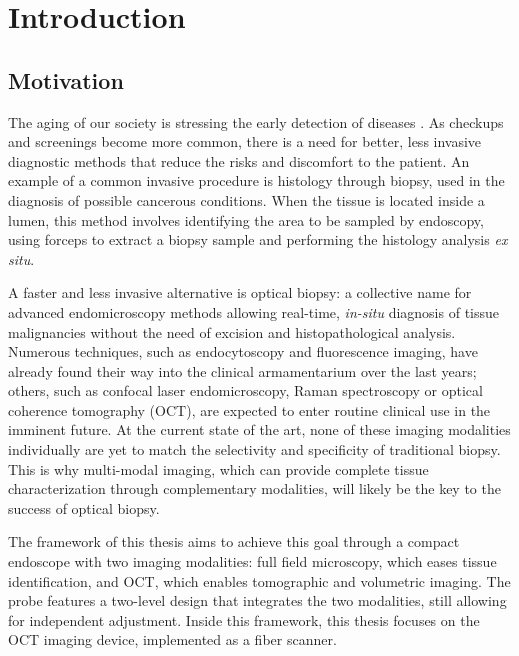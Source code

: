 %

\chapter{Introduction}
\label{Ch:Introduction}


\section{Motivation}
The aging of our society is stressing the early detection of diseases \cite{Fendrich2007}. As checkups and screenings become more common, there is a need for better, less invasive diagnostic methods that reduce the risks and discomfort to the patient. An example of a common invasive procedure is histology through biopsy, used in the diagnosis of possible cancerous conditions. When the tissue is located inside a lumen, this method involves identifying the area to be sampled by endoscopy, using forceps to extract a biopsy sample and performing the histology analysis \textit{ex situ}. 

A faster and less invasive alternative is optical biopsy: a collective name for advanced endomicroscopy methods allowing real-time, \textit{in-situ} diagnosis of tissue malignancies without the need of excision and histopathological analysis. Numerous techniques, such as endocytoscopy and fluorescence imaging, have already found their way into the clinical armamentarium over the last years; others, such as confocal laser endomicroscopy\cite{Jabbour2013}, Raman spectroscopy \cite{Bergholt2011} or optical coherence tomography (OCT)\cite{Park2012,Sun2011}, are expected to enter routine clinical use in the imminent future. At the current state of the art, none of these imaging modalities individually are yet to match the selectivity and specificity of traditional biopsy. This is why multi-modal imaging, which can provide complete tissue characterization through complementary modalities, will likely be the key to the success of optical biopsy.

The framework of this thesis aims to achieve this goal through a compact endoscope with two imaging modalities: full field microscopy, which eases tissue identification, and OCT, which enables tomographic and volumetric imaging. The probe features a two-level design that integrates the two modalities, still allowing for independent adjustment. 
Inside this framework, this thesis focuses on the OCT imaging device, implemented as a fiber scanner.

